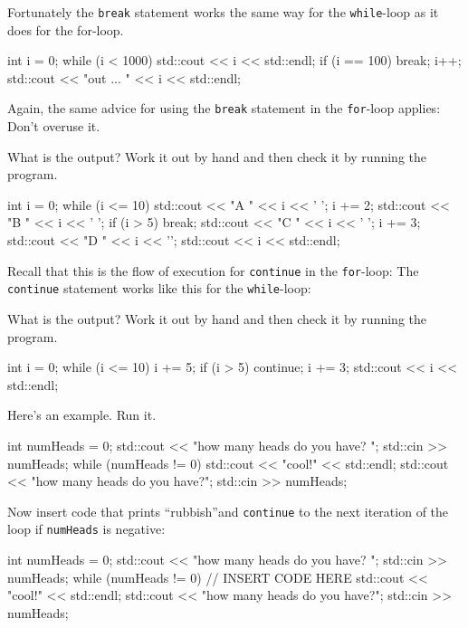Fortunately the \texttt{break} statement works the same way for the
\texttt{while}-loop as it does for the for-loop.
\begin{console}
int i = 0;
while (i < 1000)
{     
      std::cout << i << std::endl;
      if (i == 100) break;
      i++;
}
std::cout << "out ... " << i << std::endl;
\end{console}

Again, the same advice for using the \texttt{break} statement in the
\texttt{for}-loop applies: Don't overuse it.

\begin{ex}
What is the output? Work it out by hand and then
check it by running the program.
\begin{console}
int i = 0;
while (i <= 10)
{     
      std::cout << "A " << i << ' ';
      i += 2;
      std::cout << "B " << i << ' ';
      if (i > 5) break;
      std::cout << "C " << i << ' ';
      i += 3;
      std::cout << "D " << i << '\n';
}
std::cout << i << std::endl;
\end{console}
\end{ex}

\newpage{}

Recall that this is the flow of execution for \texttt{continue} in the \texttt{for}-loop:
The \texttt{continue} statement works like this for the \texttt{while}-loop:

\begin{ex}
What is the output? Work it out by hand and then check it by running the program.
\begin{console}
int i = 0;
while (i <= 10)
{     
      i += 5;
      if (i > 5) continue;
      i += 3;
}
std::cout << i << std::endl;
\end{console}
\end{ex}
\begin{ex}
Here's an example. Run it.
\begin{console}
int numHeads = 0;
std::cout << "how many heads do you have? ";
std::cin >> numHeads;
while (numHeads != 0)
{     
      std::cout << "cool!" << std::endl;
      std::cout << "how many heads do you have?";
      std::cin >> numHeads;
}
\end{console}

Now insert code that prints ``rubbish''and \texttt{continue} to the next
iteration of the loop if \texttt{numHeads} is negative:
\begin{console}
int numHeads = 0;
std::cout << "how many heads do you have? ";
std::cin >> numHeads;
while (numHeads != 0)
{     
      // INSERT CODE HERE
      std::cout << "cool!" << std::endl;
      std::cout << "how many heads do you have?";
      std::cin >> numHeads;
}
\end{console}
\end{ex}
\newpage{}

